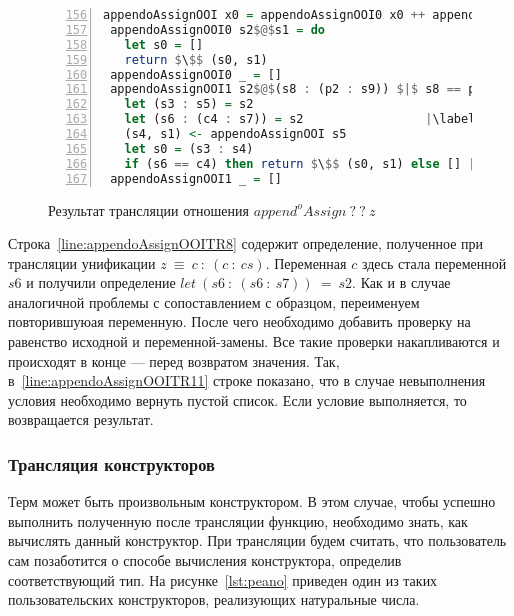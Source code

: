 \begin{figure}[h!]
  \begin{center}
  \begin{minipage}{0.7\textwidth}
  \begin{lstlisting}[language=Haskell, frame=single, numbers=left,numberstyle=\small, firstnumber=156, escapechar=|]
 appendoAssignOOI x0 = appendoAssignOOI0 x0 ++ appendoAssignOOI1 x0
 appendoAssignOOI0 s2$@$s1 = do
   let s0 = []
   return $\$$ (s0, s1)
 appendoAssignOOI0 _ = []
 appendoAssignOOI1 s2$@$(s8 : (p2 : s9)) $|$ s8 == p2 = do
   let (s3 : s5) = s2
   let (s6 : (c4 : s7)) = s2                 |\label{line:appendoAssignOOITR8}|
   (s4, s1) <- appendoAssignOOI s5
   let s0 = (s3 : s4)
   if (s6 == c4) then return $\$$ (s0, s1) else [] |\label{line:appendoAssignOOITR11}|
 appendoAssignOOI1 _ = []
    \end{lstlisting}
  \end{minipage}
  \end{center}
  \caption{Результат трансляции отношения $append^oAssign \ ? \ ? \ z$}
  \label{lst:appendoAssignOOITR}
\end{figure}

Строка~\ref{line:appendoAssignOOITR8} содержит определение, полученное при трансляции унификации $z~\equiv~c~:~(c~:~cs)$.
Переменная $c$ здесь стала переменной $s6$ и получили определение $let~(s6~:~(s6~:~s7))~=~s2$.
Как и в случае аналогичной проблемы с сопоставлением с образцом, переименуем повторившуюая переменную.
После чего необходимо добавить проверку на равенство исходной и переменной-замены.
Все такие проверки накапливаются и происходят в конце --- перед возвратом значения.
Так, в~\ref{line:appendoAssignOOITR11} строке показано, что в случае невыполнения условия необходимо вернуть пустой список.
Если условие выполняется, то возвращается результат.


\subsubsection{Трансляция конструкторов}

Терм \miniKanren{} может быть произвольным конструктором.
В этом случае, чтобы успешно выполнить полученную после трансляции функцию, необходимо знать, как вычислять данный конструктор.
При трансляции будем считать, что пользователь сам позаботится о способе вычисления конструктора, определив соответствующий тип.
На рисунке~\ref{lst:peano} приведен один из таких пользовательских конструкторов, реализующих натуральные числа.

